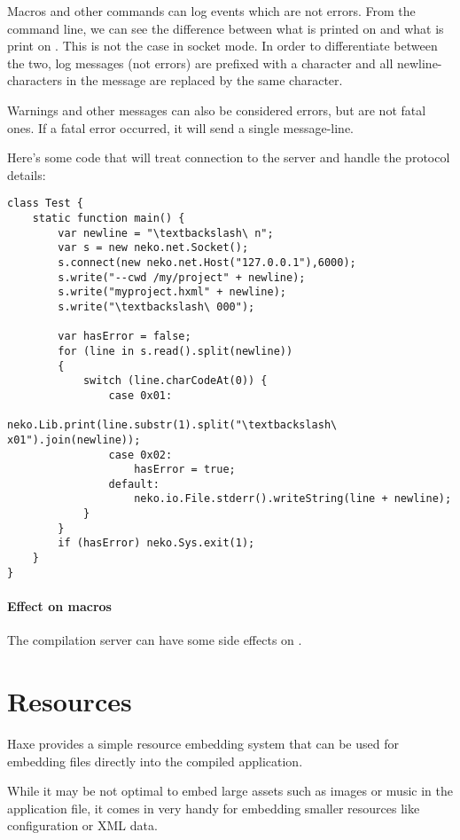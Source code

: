 Macros and other commands can log events which are not errors. From the command line, we can see the difference between what is printed on  and what is print on . This is not the case in socket mode. In order to differentiate between the two, log messages (not errors) are prefixed with a  character and all newline-characters in the message are replaced by the same  character.

Warnings and other messages can also be considered errors, but are not fatal ones. If a fatal error occurred, it will send a single  message-line.

Here's some code that will treat connection to the server and handle the protocol details:

\begin{lstlisting}
class Test {
    static function main() {
		var newline = "\textbackslash\ n";
        var s = new neko.net.Socket();
        s.connect(new neko.net.Host("127.0.0.1"),6000);
        s.write("--cwd /my/project" + newline);
        s.write("myproject.hxml" + newline);
        s.write("\textbackslash\ 000");
		
        var hasError = false;
        for (line in s.read().split(newline))
		{
            switch (line.charCodeAt(0)) {
				case 0x01: 
					neko.Lib.print(line.substr(1).split("\textbackslash\ x01").join(newline));
				case 0x02: 
					hasError = true;
				default: 
					neko.io.File.stderr().writeString(line + newline);
            }
		}
        if (hasError) neko.Sys.exit(1);
    }
}
\end{lstlisting}

\paragraph{Effect on macros}
The compilation server can have some side effects on .



\section{Resources}
\label{cr-resources}

Haxe provides a simple resource embedding system that can be used for embedding files directly into the compiled application.

While it may be not optimal to embed large assets such as images or music in the application file, it comes in very handy for embedding smaller resources like configuration or XML data.

